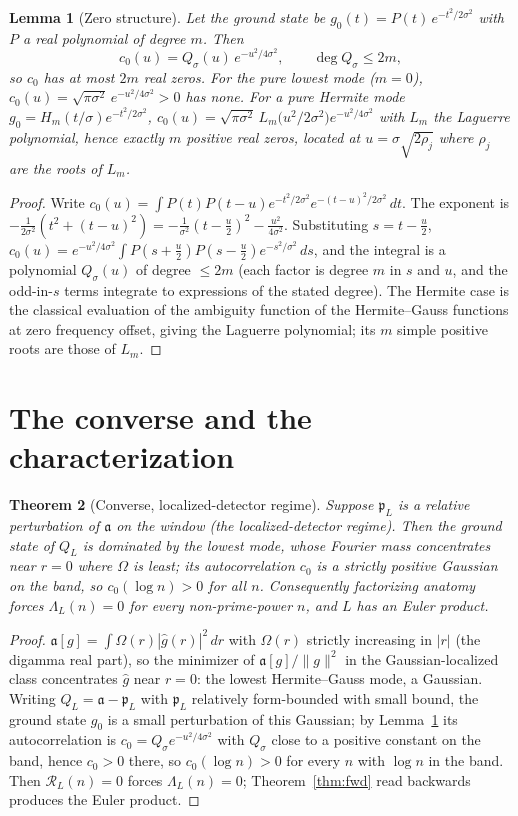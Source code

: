 \documentclass[11pt]{amsart}
\newtheorem{theorem}{Theorem}[section]
\newtheorem{lemma}[theorem]{Lemma}
\theoremstyle{definition}
\theoremstyle{remark}
\newcommand{\fa}{\mathfrak a}
\newcommand{\fp}{\mathfrak p}
\newcommand{\cR}{\mathcal R}
\begin{document}
\begin{lemma}[Zero structure]\label{lem:auto}
Let the ground state be $g_0(t)=P(t)\,e^{-t^2/2\sigma^2}$ with $P$ a real
polynomial of degree $m$. Then
\[
c_0(u)=Q_\sigma(u)\,e^{-u^2/4\sigma^2},\qquad \deg Q_\sigma\le 2m,
\]
so $c_0$ has at most $2m$ real zeros. For the pure lowest mode ($m=0$),
$c_0(u)=\sqrt{\pi\sigma^2}\,e^{-u^2/4\sigma^2}>0$ has none. For a pure Hermite
mode $g_0=H_m(t/\sigma)e^{-t^2/2\sigma^2}$,
$c_0(u)=\sqrt{\pi\sigma^2}\,L_m\!\bigl(u^2/2\sigma^2\bigr)e^{-u^2/4\sigma^2}$ with
$L_m$ the Laguerre polynomial, hence exactly $m$ positive real zeros, located at
$u=\sigma\sqrt{2\rho_j}$ where $\rho_j$ are the roots of $L_m$.
\end{lemma}
\begin{proof}
Write $c_0(u)=\int P(t)P(t-u)e^{-t^2/2\sigma^2}e^{-(t-u)^2/2\sigma^2}\,dt$. The
exponent is $-\frac1{2\sigma^2}(t^2+(t-u)^2)=-\frac1{\sigma^2}(t-\tfrac u2)^2
-\frac{u^2}{4\sigma^2}$. Substituting $s=t-\tfrac u2$,
$c_0(u)=e^{-u^2/4\sigma^2}\int P(s+\tfrac u2)P(s-\tfrac u2)e^{-s^2/\sigma^2}\,ds$,
and the integral is a polynomial $Q_\sigma(u)$ of degree $\le2m$ (each factor is
degree $m$ in $s$ and $u$, and the odd-in-$s$ terms integrate to expressions of
the stated degree). The Hermite case is the classical evaluation of the
ambiguity function of the Hermite--Gauss functions at zero frequency offset,
giving the Laguerre polynomial; its $m$ simple positive roots are those of $L_m$.
\end{proof}

\section{The converse and the characterization}\label{sec:conv}
\begin{theorem}[Converse, localized-detector regime]\label{thm:convdet}
Suppose $\fp_L$ is a relative perturbation of $\fa$ on the window (the
localized-detector regime). Then the ground state of $Q_L$ is dominated by the
lowest mode, whose Fourier mass concentrates near $r=0$ where $\Omega$ is least;
its autocorrelation $c_0$ is a strictly positive Gaussian on the band, so
$c_0(\log n)>0$ for all $n$. Consequently factorizing anatomy forces
$\Lambda_L(n)=0$ for every non-prime-power $n$, and $L$ has an Euler product.
\end{theorem}
\begin{proof}
$\fa[g]=\int\Omega(r)|\widehat g(r)|^2\,dr$ with $\Omega(r)$ strictly increasing
in $|r|$ (the digamma real part), so the minimizer of $\fa[g]/\|g\|^2$ in the
Gaussian-localized class concentrates $\widehat g$ near $r=0$: the lowest
Hermite--Gauss mode, a Gaussian. Writing $Q_L=\fa-\fp_L$ with $\fp_L$ relatively
form-bounded with small bound, the ground state $g_0$ is a small perturbation of
this Gaussian; by Lemma~\ref{lem:auto} its autocorrelation is
$c_0=Q_\sigma e^{-u^2/4\sigma^2}$ with $Q_\sigma$ close to a positive constant on
the band, hence $c_0>0$ there, so $c_0(\log n)>0$ for every $n$ with $\log n$ in
the band. Then $\cR_L(n)=0$ forces $\Lambda_L(n)=0$; Theorem~\ref{thm:fwd} read
backwards produces the Euler product.
\end{proof}
\end{document}
